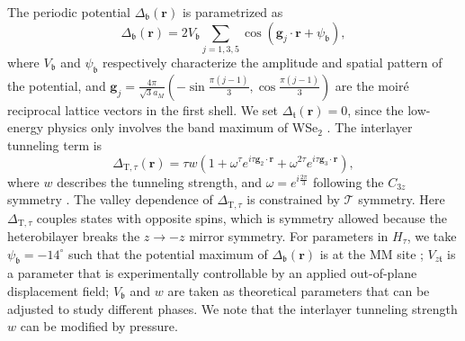 \documentclass[aps,prl,twocolumn,superscriptaddress,longbibliography]{revtex4-2}
\begin{document}
The periodic potential  $\Delta_{\mathfrak{b}}(\bm{r})$ is parametrized as 
\begin{equation}\label{eq:Delta_b}
    \Delta_{\mathfrak{b}}(\bm{r})=2V_{\mathfrak{b}}\sum_{j=1,3,5} \cos(\bm{g}_j \cdot \bm{r}+\psi_{\mathfrak{b}}),
\end{equation}
where $V_{\mathfrak{b}}$ and $\psi_{\mathfrak{b}}$ respectively characterize the amplitude and spatial pattern of the potential, and $\bm{g}_j=\frac{4\pi}{\sqrt{3} a_M} \left(- \sin \frac{\pi (j-1)}{3}, \cos \frac{\pi (j-1)}{3}\right)$ are the moir\'e reciprocal lattice vectors in the first shell. We set $\Delta_{\mathfrak{t}}(\bm{r})=0$, since the low-energy physics only involves the band maximum of WSe$_2$ \cite{zhang2021spintextured}.  The interlayer tunneling term is
\begin{equation}\label{eq:Delta_T}
    \Delta_{\text{T},\tau}(\bm{r})=\tau w \left(1+\omega^{\tau} e^{i\tau\bm{g}_2\cdot\bm{r}}+\omega^{2\tau} e^{i\tau\bm{g}_3\cdot\bm{r}} \right),
\end{equation}
where $w$ describes the tunneling strength, and $\omega=e^{i\frac{2\pi}{3}} $ following the $C_{3z}$ symmetry \cite{zhang2021spintextured}. The valley dependence of $ \Delta_{\text{T},\tau}$ is constrained by $\mathcal{T}$ symmetry. Here $ \Delta_{\text{T},\tau}$ couples states with opposite spins, which is symmetry allowed because the heterobilayer breaks the $z \rightarrow -z$  mirror symmetry. For parameters in $H_\tau$, we take $\psi_{\mathfrak{b}}=-14^{\circ}$ such that the potential maximum of $\Delta_{\mathfrak{b}}(\bm{r})$ is at the MM site \cite{zhang2021spintextured}; $V_{z\mathfrak{t}}$ is a parameter that is experimentally controllable by an applied out-of-plane displacement field; $V_{\mathfrak{b}}$ and $w$ are taken as theoretical parameters that can be adjusted to study different phases. We note that the interlayer tunneling 
strength $w$ can be modified by pressure. 
\end{document}
